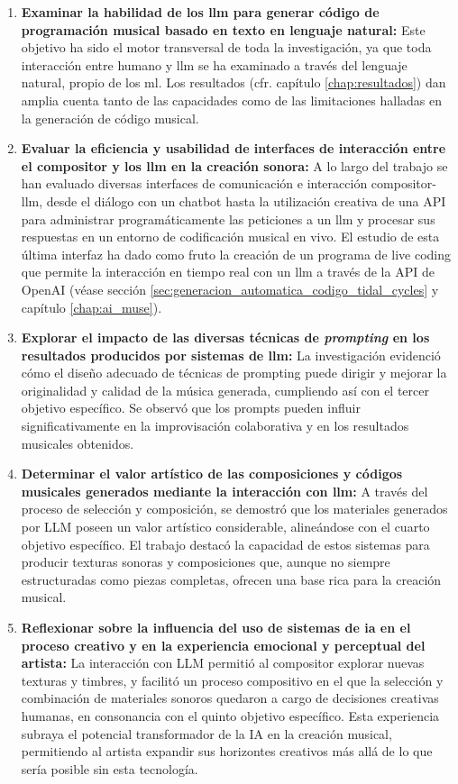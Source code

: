 \begin{enumerate}[label=\alph*)]
    \item \textbf{Examinar la habilidad de los \gls{llm} para generar código de programación musical basado en texto en lenguaje natural:} Este objetivo ha sido el motor transversal de toda la investigación, ya que toda interacción entre humano y \gls{llm} se ha examinado a través del lenguaje natural, propio de los \gls{ml}. Los resultados (cfr. capítulo \ref{chap:resultados}) dan amplia cuenta tanto de las capacidades como de las limitaciones halladas en la generación de código musical.
    

    \item \textbf{Evaluar la eficiencia y usabilidad de interfaces de interacción entre el compositor y los \gls{llm} en la creación sonora:} A lo largo del trabajo se han evaluado diversas interfaces de comunicación e interacción compositor-\gls{llm}, desde el diálogo con un chatbot hasta la utilización creativa de una API para administrar programáticamente las peticiones a un \gls{llm} y procesar sus respuestas en un entorno de codificación musical en vivo. El estudio de esta última interfaz ha dado como fruto la creación de un programa de live coding que permite la interacción en tiempo real con un \gls{llm} a través de la API de OpenAI (véase sección \ref{sec:generacion_automatica_codigo_tidal_cycles} y capítulo \ref{chap:ai_muse}).
    

    \item \textbf{Explorar el impacto de las diversas técnicas de \emph{prompting} en los resultados producidos por sistemas de \gls{llm}:} La investigación evidenció cómo el diseño adecuado de técnicas de prompting puede dirigir y mejorar la originalidad y calidad de la música generada, cumpliendo así con el tercer objetivo específico. Se observó que los prompts pueden influir significativamente en la improvisación colaborativa y en los resultados musicales obtenidos.
    \item \textbf{Determinar el valor artístico de las composiciones y códigos musicales generados mediante la interacción con \gls{llm}:} A través del proceso de selección y composición, se demostró que los materiales generados por LLM poseen un valor artístico considerable, alineándose con el cuarto objetivo específico. El trabajo destacó la capacidad de estos sistemas para producir texturas sonoras y composiciones que, aunque no siempre estructuradas como piezas completas, ofrecen una base rica para la creación musical.
    \item \textbf{Reflexionar sobre la influencia del uso de sistemas de \gls{ia} en el proceso creativo y en la experiencia emocional y perceptual del artista:} La interacción con LLM permitió al compositor explorar nuevas texturas y timbres, y facilitó un proceso compositivo en el que la selección y combinación de materiales sonoros quedaron a cargo de decisiones creativas humanas, en consonancia con el quinto objetivo específico. Esta experiencia subraya el potencial transformador de la IA en la creación musical, permitiendo al artista expandir sus horizontes creativos más allá de lo que sería posible sin esta tecnología.
\end{enumerate}
